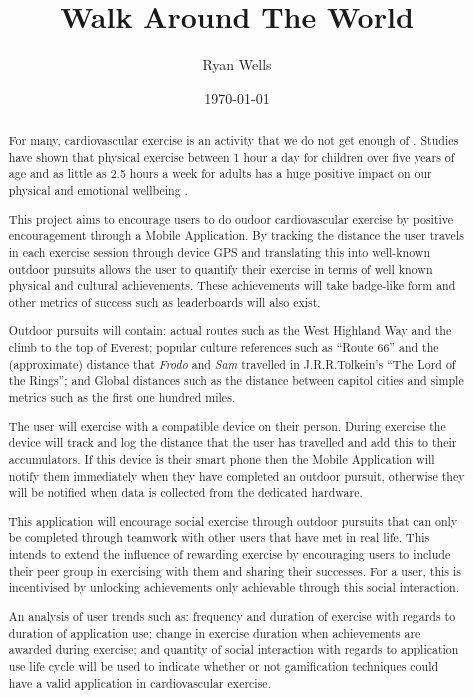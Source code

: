 \documentclass{l4proj}
\begin{document}
\newcommand{\todo}[1]{\textcolor{red}{#1}}
	
	
\title{Walk Around The World}
\author{Ryan Wells}
\date{\today}
\maketitle
\begin{abstract}
For many, cardiovascular exercise is an activity that we do not get
enough of\cite{exercise} . Studies have shown that physical exercise
between 1 hour a day for children over five years of age and as
little as 2.5 hours a week for adults has a huge positive impact on
our physical and emotional wellbeing\cite{govsurvey, amsurvey} .

This project aims to encourage users to do oudoor
cardiovascular exercise by positive encouragement through a Mobile
Application. By tracking the distance the user travels in each
exercise session through device GPS and translating this into
well-known outdoor pursuits allows the user to quantify their exercise
in terms of well known physical and cultural achievements. These
achievements will take badge-like form and other metrics of success
such as leaderboards will also exist. 

Outdoor pursuits will contain: actual routes such as the West Highland
Way and the climb to the top of Everest; popular culture references
such as ``Route 66'' and the (approximate) distance that \emph{Frodo}
and \emph{Sam} travelled in J.R.R.Tolkein's ``The Lord of the Rings'';
and Global distances such as the distance between capitol cities and
simple metrics such as the first one hundred miles. 

The user will exercise with a compatible device on their
person. During exercise the device will track and log the distance
that the user has travelled and add this to their accumulators. If
this device is their smart phone then the Mobile Application will
notify them immediately when they have completed an outdoor pursuit,
otherwise they will be notified when data is collected from the
dedicated hardware.

This application will encourage social exercise through outdoor
pursuits that can only be completed through teamwork with other users
that have met in real life. This intends to extend the influence of
rewarding exercise by encouraging users to include their peer group in
exercising with them and sharing their successes. For a user,
this is incentivised by unlocking achievements only achievable through
this social interaction.

An analysis of user trends such as: frequency and duration of exercise
with regards to duration of application use; change in exercise
duration when achievements are awarded during exercise; and quantity of
social interaction with regards to application use life cycle will be
used to indicate whether or not gamification techniques could have a
valid application in cardiovascular exercise. 

\end{abstract}
\end{document}
